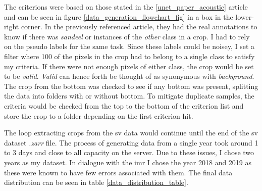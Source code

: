         The criterions were based on those stated in the \ref{unet_paper_acoustic} article and can be seen in figure \ref{data_generation_flowchart_fig} in a box in the lower-right corner. In the previously referenced article, they had the real annotations to know if there was \textit{sandeel} or instances of the \textit{other} class in a crop. I had to rely on the pseudo labels for the same task. Since these labels could be noisey, I set a filter where 100 of the pixels in the crop had to belong to a single class to satisfy my criteria. If there were not enough pixels of either class, the crop would be set to be \textit{valid}. \textit{Valid} can hence forth be thought of as synonymous with \textit{background}. The crop from the bottom was checked to see if any bottom was present, splitting the data into folders with or without bottom. To mitigate duplicate samples, the criteria would be checked from the top to the bottom of the criterion list and store the crop to a folder depending on the first criterion hit.
        
        The loop extracting crops from the \gls{sv} data would continue until the end of the \gls{sv} dataset \textit{.zarr} file.  The process of generating data from a single year took around 1 to 3 days and close to all capacity on the server. Due to these issues, I chose two years as my dataset. In dialogue with the \gls{imr} I chose the year 2018 and 2019 as these were known to have few errors associated with them. The final data distribution can be seen in table \ref{data_distribution_table}.
        
